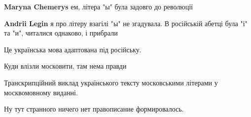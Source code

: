 \begin{itemize}
\begin{itemize}
 
\textbf{Maryna Chemerys} ем, літера "ы" була задовго до революції

\begin{itemize}
 
\textbf{Andrii Legin} я про літеру взагілі "ы" не згадувала. В російській абетці була "і" та "и", читалися однаково, і прибрали
\end{itemize}

\end{itemize}

 
Це українська мова адаптована під російську.


 
Куди влізли московити, там нема правди


 
Транскрипційний виклад українського тексту московськими літерами у
москвомовному виданні.


 

Ну тут странного ничего нет правописание формировалось.


\end{itemize}
